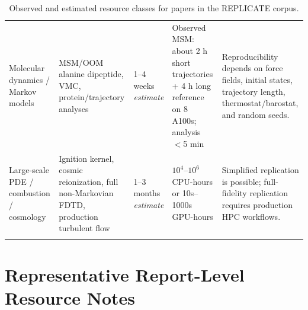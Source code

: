 \documentclass[11pt,letterpaper]{article}
\newcommand{\est}{\emph{estimate}}
\begin{document}
\begin{longtable}{p{3.0cm}p{3.6cm}p{2.4cm}p{2.8cm}p{4.4cm}}
Molecular dynamics / Markov models & MSM/OOM alanine dipeptide, VMC, protein/trajectory analyses & 1--4 weeks \est{} & Observed MSM: about 2 h short trajectories + 4 h long reference on 8 A100s; analysis $<$5 min & Reproducibility depends on force fields, initial states, trajectory length, thermostat/barostat, and random seeds. \\
\addlinespace
Large-scale PDE / combustion / cosmology & Ignition kernel, cosmic reionization, full non-Markovian FDTD, production turbulent flow & 1--3 months \est{} & $10^4$--$10^6$ CPU-hours or 10s--1000s GPU-hours & Simplified replication is possible; full-fidelity replication requires production HPC workflows. \\
\bottomrule
\caption{Observed and estimated resource classes for papers in the REPLICATE corpus.}
\end{longtable}

\section{Representative Report-Level Resource Notes}
\end{document}
